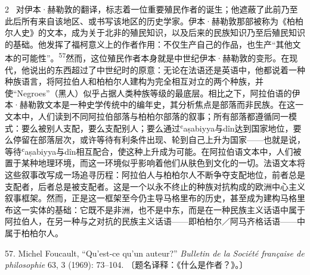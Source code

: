 \documentclass[10pt,a4paper]{article}
\begin{document}
\begin{paracol}{2}
\switchcolumn*
{\scriptsize\color{gray} [p. 14]}\ 对伊本·赫勒敦的翻译，标志着一位重要殖民作者的诞生；他遮蔽了此前乃至此后所有来自该地区、或书写该地区的历史学家。伊本·赫勒敦那部被称为《柏柏尔人史》的文本，成为关于北非的殖民知识，以及后来的民族知识乃至后殖民知识的基础。他发挥了福柯意义上的作者作用：不仅生产自己的作品，也生产“其他文本的可能性”。\nobreak\textsuperscript{57}然而，这位殖民作者本身就是中世纪伊本·赫勒敦的变形。在现代，他说出的东西超过了中世纪时的原意：无论在法语还是英语中，他都说着一种种族语言，将阿拉伯人和柏柏尔人建构为完全相互对立的两个种族，并使“Negroes”（黑人）似乎占据人类种族等级的最底层。相比之下，阿拉伯语的伊本·赫勒敦文本是一种史学传统中的编年史，其分析焦点是部落而非民族。在这一文本中，人们读到不同阿拉伯部落与柏柏尔部落的叙事；所有部落都遵循同一模式：要么被别人支配，要么支配别人；要么通过ʿaṣabiyya与dîn达到国家地位，要么停留在部落层次，或许等待有利条件出现、轮到自己上升为国家——也就是说，等待ʿaṣabiyya与dîn相互配合，使这种上升成为可能。在阿拉伯语文本中，人们被置于某种地理环境，而这一环境似乎影响着他们从肤色到文化的一切。法语文本将这些叙事改写成一场追寻历程：阿拉伯人与柏柏尔人不断争夺支配地位，前者总是支配者，后者总是被支配者。这是一个以永不终止的种族对抗构成的欧洲中心主义叙事框架。然而，正是这一框架至今仍主导马格里布的历史，甚至成为建构马格里布这一实体的基础：它既不是非洲，也不是中东，而是在一种民族主义话语中属于阿拉伯人，在另一种与之对抗的民族主义话语——即柏柏尔／阿马齐格话语——中属于柏柏尔人。\par{\small 57. Michel Foucault, “Qu’est-ce qu’un auteur?” \textit{Bulletin de la Société française de philosophie} 63, 3 (1969): 73–104. 〔题名译释：《什么是作者？》。〕\par}
\switchcolumn

\end{paracol}
\end{document}
